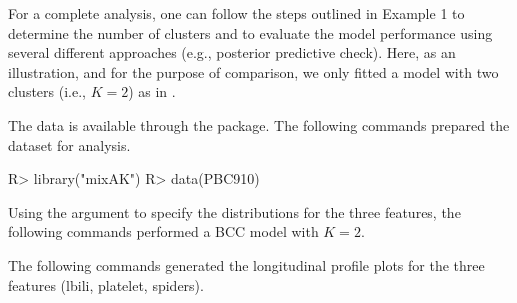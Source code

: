 For a complete analysis, one can follow the steps outlined in Example 1 to determine the number of clusters and to evaluate the model performance using several different approaches (e.g., posterior predictive check). Here, as an illustration, and for the purpose of comparison, we only fitted a model with two clusters (i.e., $K=2$) as in \citet{Komarek2013}. 

The data is available through the   package. The following commands prepared the dataset for analysis.

\begin{example}
R> library("mixAK")
R> data(PBC910)
\end{example} 
Using the argument  to specify the distributions for the three features, the following commands performed a BCC model with $K=2$.


The following commands generated the longitudinal profile plots for the three features (lbili, platelet, spiders). 

